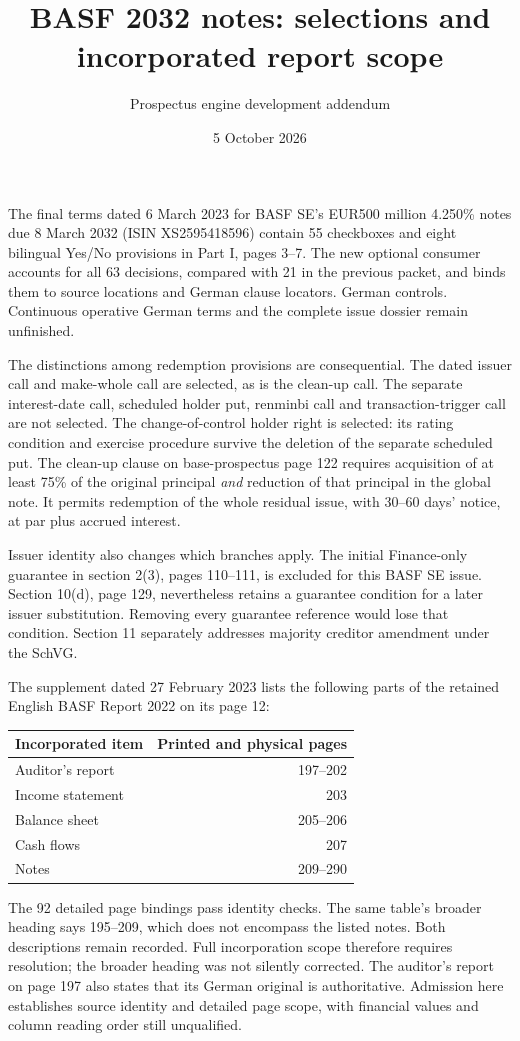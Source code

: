 \documentclass[11pt]{article}
\title{BASF 2032 notes: selections and incorporated report scope}
\author{Prospectus engine development addendum}
\date{5 October 2026}
\begin{document}
\maketitle
The final terms dated 6 March 2023 for BASF SE's EUR500 million
4.250\% notes due 8 March 2032 (ISIN XS2595418596) contain 55 checkboxes
and eight bilingual Yes/No provisions in Part I, pages 3--7. The new
optional consumer accounts for all 63 decisions, compared with 21 in the
previous packet, and binds them to source locations and German clause
locators. German controls. Continuous operative German terms and the
complete issue dossier remain unfinished.

The distinctions among redemption provisions are consequential. The
dated issuer call and make-whole call are selected, as is the clean-up
call. The separate interest-date call, scheduled holder put, renminbi
call and transaction-trigger call are not selected. The
change-of-control holder right is selected: its rating condition and
exercise procedure survive the deletion of the separate scheduled put.
The clean-up clause on base-prospectus page 122 requires acquisition of
at least 75\% of the original principal \emph{and} reduction of that
principal in the global note. It permits redemption of the whole
residual issue, with 30--60 days' notice, at par plus accrued interest.

Issuer identity also changes which branches apply. The initial
Finance-only guarantee in section 2(3), pages 110--111, is excluded for
this BASF SE issue. Section 10(d), page 129, nevertheless retains a
guarantee condition for a later issuer substitution. Removing every
guarantee reference would lose that condition. Section 11 separately
addresses majority creditor amendment under the SchVG.

The supplement dated 27 February 2023 lists the following parts of the
retained English BASF Report 2022 on its page 12:
\begin{center}
\begin{tabular}{lr}
\toprule
Incorporated item & Printed and physical pages\\
\midrule
Auditor's report &197--202\\
Income statement &203\\
Balance sheet &205--206\\
Cash flows &207\\
Notes &209--290\\
\bottomrule
\end{tabular}
\end{center}
The 92 detailed page bindings pass identity checks. The same table's
broader heading says 195--209, which does not encompass the listed notes.
Both descriptions remain recorded. Full incorporation scope therefore
requires resolution; the broader heading was not silently corrected.
The auditor's report on page 197 also states that its German original
is authoritative. Admission here establishes source identity and
detailed page scope, with financial values and column reading order
still unqualified.
\end{document}
